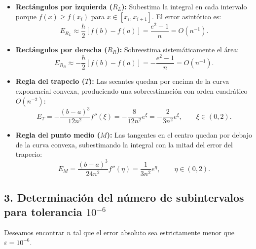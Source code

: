 \documentclass[11pt,a4paper]{article}
\begin{document}
\begin{itemize}[leftmargin=*]
    \item \textbf{Rectángulos por izquierda ($R_L$):} Subestima la integral en cada intervalo porque $f(x) \ge f(x_i)$ para $x \in [x_i, x_{i+1}]$. El error asintótico es:
    \begin{equation}
        E_{R_L} \approx \frac{h}{2} [f(b) - f(a)] = \frac{e^2 - 1}{n} = O(n^{-1}).
    \end{equation}
    \item \textbf{Rectángulos por derecha ($R_R$):} Sobreestima sistemáticamente el área:
    \begin{equation}
        E_{R_R} \approx -\frac{h}{2} [f(b) - f(a)] = -\frac{e^2 - 1}{n} = O(n^{-1}).
    \end{equation}
    \item \textbf{Regla del trapecio ($T$):} Las secantes quedan por encima de la curva exponencial convexa, produciendo una sobreestimación con orden cuadrático $O(n^{-2})$:
    \begin{equation}
        E_T = -\frac{(b-a)^3}{12 n^2} f''(\xi) = -\frac{8}{12 n^2} e^\xi = -\frac{2}{3 n^2} e^\xi, \qquad \xi \in (0, 2).
    \end{equation}
    \item \textbf{Regla del punto medio ($M$):} Las tangentes en el centro quedan por debajo de la curva convexa, subestimando la integral con la mitad del error del trapecio:
    \begin{equation}
        E_M = \frac{(b-a)^3}{24 n^2} f''(\eta) = \frac{1}{3 n^2} e^\eta, \qquad \eta \in (0, 2).
    \end{equation}
\end{itemize}

\subsection{3. Determinación del número de subintervalos para tolerancia $10^{-6}$}
Deseamos encontrar $n$ tal que el error absoluto sea estrictamente menor que $\varepsilon = 10^{-6}$.
\end{document}
